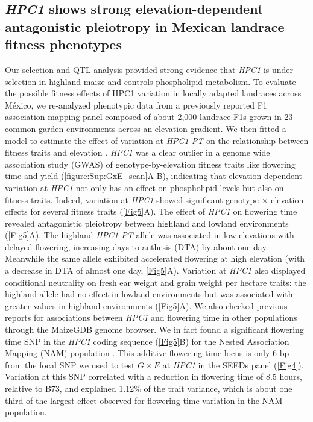 \documentclass[9pt,twocolumn,twoside,lineno]{biorxiv}
\newcommand{\hpc}{\textit{HPC1}\xspace}
\begin{document}
\subsection{\hpc shows strong elevation-dependent antagonistic pleiotropy in Mexican landrace fitness phenotypes}
Our selection and QTL analysis provided strong evidence that \hpc is under selection in highland maize and controls phospholipid metabolism. 
To evaluate the possible fitness effects of HPC1 variation in locally adapted landraces across M\'exico, we re-analyzed phenotypic data from a previously reported F1 association mapping panel \cite{Romero_Navarro2017-cn, Gates2019-xu} composed of about 2,000 landrace F1s grown in 23 common garden environments across an elevation gradient.  
We then fitted a model to estimate the effect of variation at \textit{HPC1-PT} on the relationship between fitness traits and elevation \cite{Runcie2019-Gr}.
\hpc was a clear outlier in a genome wide association study (GWAS) of genotype-by-elevation fitness traits like flowering time and yield (\cref{figure:Sup:GxE_scan}A-B), indicating that elevation-dependent variation at \hpc not only has an effect on phospholipid levels but also on fitness traits.
Indeed, variation at \hpc showed significant genotype $\times$ elevation effects for several fitness traits (\cref{Fig5}A). 
The effect of \hpc on flowering time revealed antagonistic pleiotropy between highland and lowland environments (\cref{Fig5}A). 
The highland \textit{HPC1-PT} allele was associated in low elevations with delayed flowering, increasing days to anthesis (DTA) by about one day.
Meanwhile the same allele exhibited accelerated flowering at high elevation (with a decrease in DTA of almost one day, \cref{Fig5}A).
Variation at \hpc also displayed conditional neutrality on fresh ear weight and grain weight per hectare traits: the highland allele had no effect in lowland environments but was associated with greater values in highland environments (\cref{Fig5}A).
We also checked previous reports for associations between \hpc and flowering time in other populations through the MaizeGDB \cite{Woodhouse2021-wd} genome browser. 
We in fact found a significant flowering time SNP in the \hpc coding sequence (\cref{Fig5}B) for the Nested Association Mapping (NAM) population \cite{Wallace2014-yy}. 
This additive flowering time locus is only 6 bp from the focal SNP we used to test  $G \times E$ at \hpc in the SEEDs panel (\cref{Fig4}). 
Variation at this SNP correlated with a reduction in flowering time of 8.5 hours, relative to B73, and explained 1.12\% of the trait variance, which is about one third of the largest effect observed for flowering time variation in the NAM population. 
\end{document}
